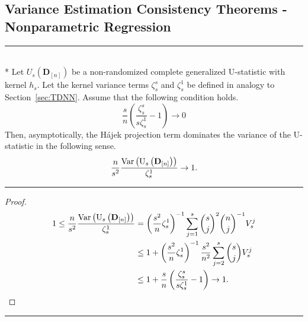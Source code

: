 \subsection{Variance Estimation Consistency Theorems - Nonparametric Regression}
\hrule

\begin{lem}\label{lem:Hajek_Dominance}\mbox{}\\*
	Let $U_{s}\left(\mathbf{D}_{[n]}\right)$ be a non-randomized complete generalized U-statistic with kernel $h_s$.
	Let the kernel variance terms $\zeta_{s}^{s}$ and $\zeta_{s}^{1}$ be defined in analogy to Section~\ref{sec:TDNN}.
	Assume that the following condition holds.
	\begin{equation}
		\frac{s}{n}\left(\frac{\zeta_{s}^{s}}{s \zeta_{s}^{1}} - 1\right) \rightarrow 0
	\end{equation}
	Then, asymptotically, the H\'ajek projection term dominates the variance of the U-statistic in the following sense.
	\begin{equation}
		\frac{n}{s^2}\frac{\text{Var}\left(\mathrm{U}_{s}\left(\mathbf{D}_{[n]}\right)\right)}{\zeta_{s}^{1}}
		\rightarrow 1.
	\end{equation}
\end{lem}
\hrule
\begin{proof}
	\begin{equation}
		\begin{aligned}
			1 \leq \frac{n}{s^2}\frac{\text{Var}\left(\mathrm{U}_{s}\left(\mathbf{D}_{[n]}\right)\right)}{\zeta_{s}^{1}}
			 & = \left(\frac{s^2}{n} \zeta_{s}^{1}\right)^{-1} \sum_{j=1}^{s}\binom{s}{j}^2\binom{n}{j}^{-1} V_{s}^{j}     \\
			 & \leq 1 + \left(\frac{s^2}{n} \zeta_{s}^{1}\right)^{-1} \frac{s^2}{n^2} \sum_{j=2}^{s}\binom{s}{j} V_{s}^{j} \\
			 & \leq 1 + \frac{s}{n}\left(\frac{\zeta_{s}^{s}}{s\zeta_{s}^{1}} - 1\right)
			\rightarrow 1.
		\end{aligned}
	\end{equation}
\end{proof}

\hrule

